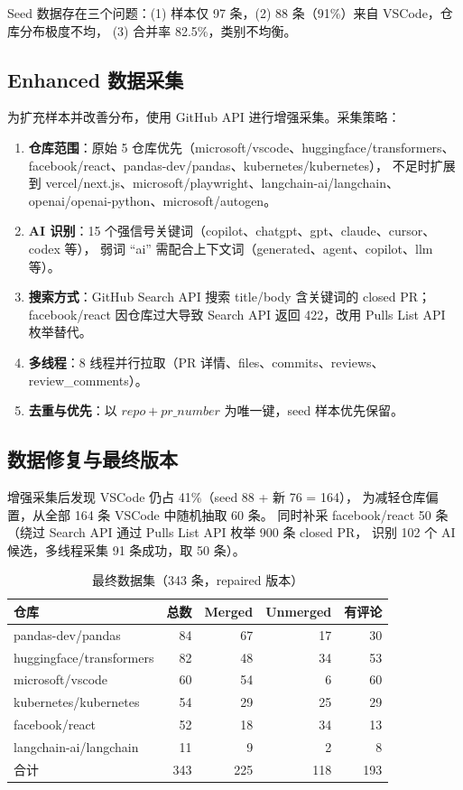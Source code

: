 \documentclass{experimentreport}
\begin{document}
Seed 数据存在三个问题：(1) 样本仅 97 条，(2) 88 条（91\%）来自 VSCode，仓库分布极度不均，
(3) 合并率 82.5\%，类别不均衡。

\subsection{Enhanced 数据采集}

为扩充样本并改善分布，使用 GitHub API 进行增强采集。采集策略：

\begin{enumerate}
    \item \textbf{仓库范围}：原始 5 仓库优先（microsoft/vscode、huggingface/transformers、
          facebook/react、pandas-dev/pandas、kubernetes/kubernetes），
          不足时扩展到 vercel/next.js、microsoft/playwright、langchain-ai/langchain、
          openai/openai-python、microsoft/autogen。
    \item \textbf{AI 识别}：15 个强信号关键词（copilot、chatgpt、gpt、claude、cursor、codex 等），
          弱词 ``ai'' 需配合上下文词（generated、agent、copilot、llm 等）。
    \item \textbf{搜索方式}：GitHub Search API 搜索 title/body 含关键词的 closed PR；
          facebook/react 因仓库过大导致 Search API 返回 422，改用 Pulls List API 枚举替代。
    \item \textbf{多线程}：8 线程并行拉取（PR 详情、files、commits、reviews、review\_comments）。
    \item \textbf{去重与优先}：以 $repo+pr\_number$ 为唯一键，seed 样本优先保留。
\end{enumerate}

\subsection{数据修复与最终版本}

增强采集后发现 VSCode 仍占 41\%（seed 88 + 新 76 = 164），
为减轻仓库偏置，从全部 164 条 VSCode 中随机抽取 60 条。
同时补采 facebook/react 50 条（绕过 Search API 通过 Pulls List API 枚举 900 条 closed PR，
识别 102 个 AI 候选，多线程采集 91 条成功，取 50 条）。

\begin{table}[htbp]
\centering
\caption{最终数据集（343 条，repaired 版本）}
\begin{tabular}{lrrrr}
\toprule
仓库 & 总数 & Merged & Unmerged & 有评论 \\
\midrule
pandas-dev/pandas & 84 & 67 & 17 & 30 \\
huggingface/transformers & 82 & 48 & 34 & 53 \\
microsoft/vscode & 60 & 54 & 6 & 60 \\
kubernetes/kubernetes & 54 & 29 & 25 & 29 \\
facebook/react & 52 & 18 & 34 & 13 \\
langchain-ai/langchain & 11 & 9 & 2 & 8 \\
\midrule
合计 & 343 & 225 & 118 & 193 \\
\bottomrule
\end{tabular}
\end{table}
\end{document}
